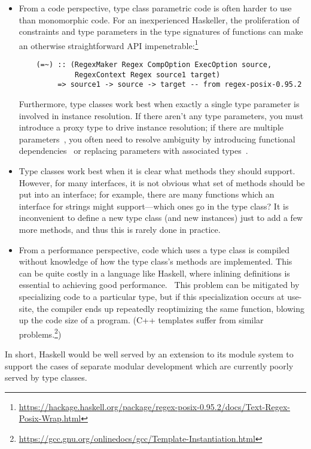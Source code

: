 \begin{itemize}
    \item From a code perspective, type class parametric code is often
    harder to use than monomorphic code.  For an inexperienced
    Haskeller, the proliferation of constraints and type parameters in the
    type signatures of functions can make an otherwise straightforward
    API impenetrable:\footnote{\url{https://hackage.haskell.org/package/regex-posix-0.95.2/docs/Text-Regex-Posix-Wrap.html}}

\begin{lstlisting}
    (=~) :: (RegexMaker Regex CompOption ExecOption source,
             RegexContext Regex source1 target)
         => source1 -> source -> target -- from regex-posix-0.95.2
\end{lstlisting}

    Furthermore, type classes work best when exactly a single type
    parameter is involved in instance resolution. If there aren't any type
    parameters, you must introduce a proxy type to drive instance resolution; if
    there are multiple parameters~\cite{lfp92}, you often need to resolve ambiguity
    by introducing functional
    dependencies~\cite{Jones:2000:TCF:645394.651909} or replacing
    parameters with associated types~\cite{towards-open-type-functions-haskell}.

    \item Type classes work best when it is clear what methods they
    should support.  However, for many interfaces, it is not obvious
    what set of methods should be put into an interface; for example,
    there are many functions which an interface for strings might
    support---which ones go in the type class?  It is inconvenient
    to define a new type class (and new instances) just to add a
    few more methods, and thus this is rarely done in practice.

    \item From a performance perspective, code which uses a type class
    is compiled without knowledge of how the type class's
    methods are implemented.  This can be quite costly in a language
    like Haskell, where inlining definitions is essential to achieving
    good performance.~\cite{PeytonJones:2002:SGH:968417.968422}  This problem can
    be mitigated by specializing code to a particular type, but if this
    specialization occurs at use-site, the compiler ends up repeatedly reoptimizing
    the same function, blowing up the code size of
    a program. (C++ templates suffer from similar problems.\footnote{\url{https://gcc.gnu.org/onlinedocs/gcc/Template-Instantiation.html}})
\end{itemize}
%
In short, Haskell would be well served by an extension to its module
system to support the cases of separate modular development which are
currently poorly served by type classes.

